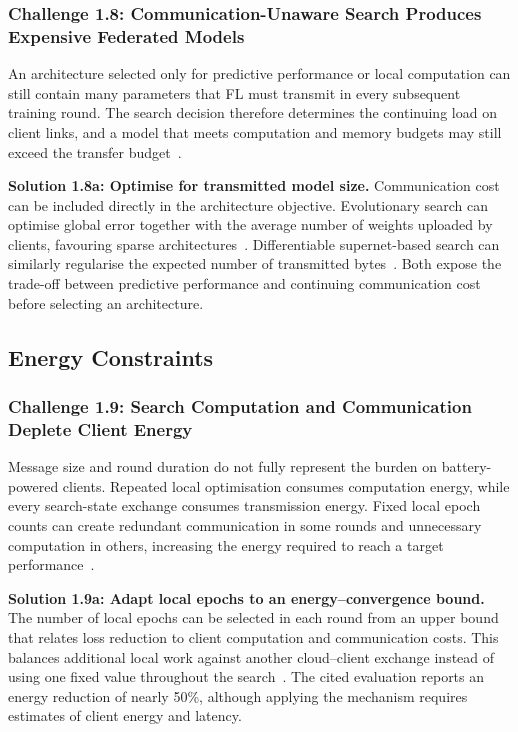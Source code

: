 \subsubsection{Challenge 1.8: Communication-Unaware Search Produces Expensive Federated Models}

An architecture selected only for predictive performance or local computation can still contain many parameters that FL must transmit in every subsequent training round. The search decision therefore determines the continuing load on client links, and a model that meets computation and memory budgets may still exceed the transfer budget~\cite{multi_objective_evo_fl_2020}.

\noindent\textbf{Solution 1.8a: Optimise for transmitted model size.} Communication cost can be included directly in the architecture objective. Evolutionary search can optimise global error together with the average number of weights uploaded by clients, favouring sparse architectures~\cite{multi_objective_evo_fl_2020}. Differentiable supernet-based search can similarly regularise the expected number of transmitted bytes~\cite{fedregnas_2025}. Both expose the trade-off between predictive performance and continuing communication cost before selecting an architecture.

\subsection{Energy Constraints}

\subsubsection{Challenge 1.9: Search Computation and Communication Deplete Client Energy}

Message size and round duration do not fully represent the burden on battery-powered clients. Repeated local optimisation consumes computation energy, while every search-state exchange consumes transmission energy. Fixed local epoch counts can create redundant communication in some rounds and unnecessary computation in others, increasing the energy required to reach a target performance~\cite{f2nas_2024}.

\noindent\textbf{Solution 1.9a: Adapt local epochs to an energy--convergence bound.} The number of local epochs can be selected in each round from an upper bound that relates loss reduction to client computation and communication costs. This balances additional local work against another cloud--client exchange instead of using one fixed value throughout the search~\cite{f2nas_2024}. The cited evaluation reports an energy reduction of nearly 50\%, although applying the mechanism requires estimates of client energy and latency.

